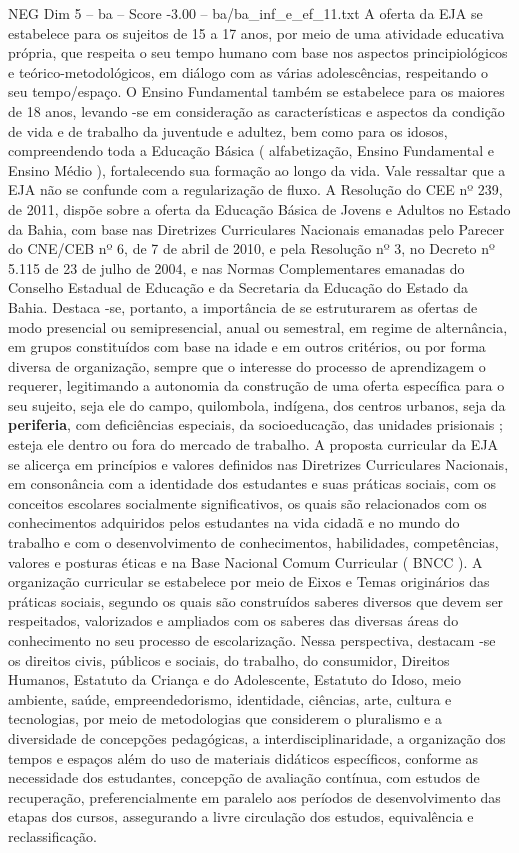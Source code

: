 \begin{textsample}{NEG Dim 5 – ba – Score -3.00 – ba/ba\_inf\_e\_ef\_11.txt}
A oferta da EJA se estabelece para os sujeitos de 15 a 17 anos, por meio de uma atividade educativa própria, que respeita o seu tempo humano com base nos aspectos principiológicos e teórico-metodológicos, em diálogo com as várias adolescências, respeitando o seu tempo/espaço.
O Ensino Fundamental também se estabelece para os maiores de 18 anos, levando -se em consideração as características e aspectos da condição de vida e de trabalho da juventude e adultez, bem como para os idosos, compreendendo toda a Educação Básica ( alfabetização, Ensino Fundamental e Ensino Médio ), fortalecendo sua formação ao longo da vida.
Vale ressaltar que a EJA não se confunde com a regularização de fluxo.
A Resolução do CEE nº 239, de 2011, dispõe sobre a oferta da Educação Básica de Jovens e Adultos no Estado da Bahia, com base nas Diretrizes Curriculares Nacionais emanadas pelo Parecer do CNE/CEB nº 6, de 7 de abril de 2010, e pela Resolução nº 3, no Decreto nº 5.115 de 23 de julho de 2004, e nas Normas Complementares emanadas do Conselho Estadual de Educação e da Secretaria da Educação do Estado da Bahia.
Destaca -se, portanto, a importância de se estruturarem as ofertas de modo presencial ou semipresencial, anual ou semestral, em regime de alternância, em grupos constituídos com base na idade e em outros critérios, ou por forma diversa de organização, sempre que o interesse do processo de aprendizagem o requerer, legitimando a autonomia da construção de uma oferta específica para o seu sujeito, seja ele do campo, quilombola, indígena, dos centros urbanos, seja da \textbf{periferia}, com deficiências especiais, da socioeducação, das unidades prisionais ; esteja ele dentro ou fora do mercado de trabalho.
A proposta curricular da EJA se alicerça em princípios e valores definidos nas Diretrizes Curriculares Nacionais, em consonância com a identidade dos estudantes e suas práticas sociais, com os conceitos escolares socialmente significativos, os quais são relacionados com os conhecimentos adquiridos pelos estudantes na vida cidadã e no mundo do trabalho e com o desenvolvimento de conhecimentos, habilidades, competências, valores e posturas éticas e na Base Nacional Comum Curricular ( BNCC ).
A organização curricular se estabelece por meio de Eixos e Temas originários das práticas sociais, segundo os quais são construídos saberes diversos que devem ser respeitados, valorizados e ampliados com os saberes das diversas áreas do conhecimento no seu processo de escolarização.
Nessa perspectiva, destacam -se os direitos civis, públicos e sociais, do trabalho, do consumidor, Direitos Humanos, Estatuto da Criança e do Adolescente, Estatuto do Idoso, meio ambiente, saúde, empreendedorismo, identidade, ciências, arte, cultura e tecnologias, por meio de metodologias que considerem o pluralismo e a diversidade de concepções pedagógicas, a interdisciplinaridade, a organização dos tempos e espaços além do uso de materiais didáticos específicos, conforme as necessidade dos estudantes, concepção de avaliação contínua, com estudos de recuperação, preferencialmente em paralelo aos períodos de desenvolvimento das etapas dos cursos, assegurando a livre circulação dos estudos, equivalência e reclassificação.

\end{textsample}
